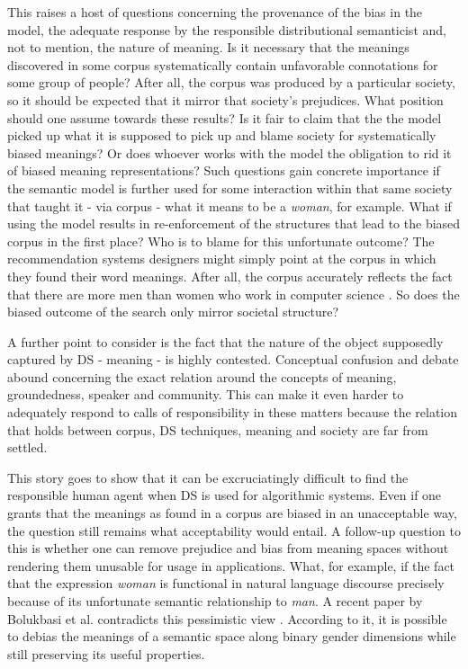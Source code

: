 \documentclass{article}
\begin{document}
This raises a host of questions concerning the provenance of the bias in the model, the adequate response by the responsible distributional semanticist and, not to mention, the nature of meaning.
Is it necessary that the meanings discovered in some corpus systematically contain unfavorable connotations for some group of people? After all, the corpus was produced by a particular society, so it should be expected that it mirror that society's prejudices. What position should one assume towards these results? Is it fair to claim that the the model picked up what it is supposed to pick up and blame society for systematically biased meanings? Or does whoever works with the model the obligation to rid it of biased meaning representations? Such questions gain concrete importance if the semantic model is further used for some interaction within that same society that taught it - via corpus - what it means to be a \emph{woman}, for example. 
What if using the model results in re-enforcement of the structures that lead to the biased corpus in the first place? 
Who is to blame for this unfortunate outcome? The recommendation systems designers might simply point at the corpus in which they found their word meanings. After all, the corpus accurately reflects the fact that there are more men than women who work in computer science \cite{womenincs}. So does the biased outcome of the search only mirror societal structure? %

A further point to consider is the fact that the nature of the object supposedly captured by DS - meaning - is highly contested. Conceptual confusion and debate abound concerning the exact relation around the concepts of meaning, groundedness, speaker and community. This can make it even harder to adequately respond to calls of responsibility in these matters because the relation that holds between corpus, DS techniques, meaning and society are far from settled. 

This story goes to show that it can be excruciatingly difficult to find the responsible human agent when DS is used for algorithmic systems. Even if one grants that the meanings as found in a corpus are biased in an unacceptable way, the question still remains what acceptability would entail. A follow-up question to this is whether one can remove prejudice and bias from meaning spaces without rendering them unusable for usage in applications. What, for example, if the fact that the expression \emph{woman} is functional in natural language discourse precisely because of its unfortunate semantic relationship to \emph{man}. A recent paper by Bolukbasi et al. contradicts this pessimistic view \cite{bolukbasi2016man}. According to it, it is possible to debias the meanings of a semantic space along binary gender dimensions while still preserving its useful properties.
\end{document}
